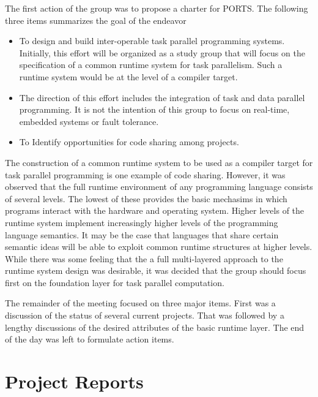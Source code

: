 \makeinfo




The first action of the group was to propose a charter for PORTS.
The following three items summarizes the goal of the endeavor
\begin{itemize}

\item To design and build inter-operable task parallel programming systems.
Initially, this effort will be organized as a study group that
will focus on the specification of a common runtime system
for task parallelism.  Such a runtime system would be at the level
of a compiler target.

\item The direction of this effort 
includes the integration of task and data parallel programming. It is
not the intention of this group to focus on real-time, embedded systems
or fault tolerance.

\item To Identify opportunities for code sharing among projects.

\end{itemize}
The construction of a common runtime system to be used as a compiler
target for task parallel programming is one example of code sharing.
However, it was observed that the full runtime environment of
any programming language consists of several levels. The lowest
of these provides the basic mechasims in which programs interact
with the hardware and operating system.  Higher levels of the
runtime system implement increasingly higher levels of the programming language
semantics.  It may be the case that languages that share
certain semantic ideas will be able to exploit common runtime structures at 
higher levels.  While there was some feeling that the a full
multi-layered approach to the runtime system design was desirable,
it was decided that the group should focus first on the foundation
layer for task parallel computation.

The remainder of the meeting focused on three major items.
First was a discussion of the status of several current projects.
That was followed by a lengthy discussions of the desired attributes
of the basic runtime layer.  The end of the day was left to formulate
action items.

\section{Project Reports}

